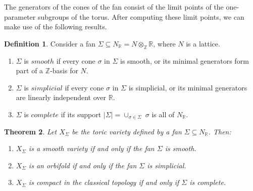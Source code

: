 \documentclass{amsart}
\newcommand{\R}{\mathbb{R}}
\newcommand{\Z}{\mathbb{Z}}
\newtheorem{theorem}{Theorem}[section]
\theoremstyle{definition}
\newtheorem{definition}[theorem]{Definition}
\theoremstyle{remark}
\numberwithin{equation}{section}
\begin{document}
The generators of the cones of the fan consist of the limit points of the one-parameter subgroups of the torus. After computing these limit points, we can make use of the following results. 

\begin{definition} Consider a fan $\Sigma \subseteq N_\R = N \otimes_\Z \R$, where $N$ is a lattice. 
\begin{enumerate}
\item $\Sigma$ is $smooth$ if every cone $\sigma$ in $\Sigma$ is smooth, or its minimal generators form part of a $\Z$-basis for $N$. 
\item $\Sigma$ is $simplicial$ if every cone $\sigma$ in $\Sigma$ is simplicial, or its minimal generators are linearly independent over $\R$. 
\item $\Sigma$ is $complete$ if its support $\left|\Sigma\right| = \cup_{\sigma \in \Sigma}\;\sigma$ is all of $N_\R$. 
\end{enumerate}
\end{definition}

\begin{theorem} 
\label{TV}
Let $X_\Sigma$ be the toric variety defined by a fan $\Sigma \subseteq N_\R$. Then:

\begin{enumerate}
\item $X_\Sigma$ is a smooth variety if and only if the fan $\Sigma$ is smooth.
\item $X_\Sigma$ is an orbifold if and only if the fan $\Sigma$ is simplicial.
\item $X_\Sigma$ is compact in the classical topology if and only if $\Sigma$ is complete. 
\end{enumerate}
\end{theorem}













{}



\end{document}

